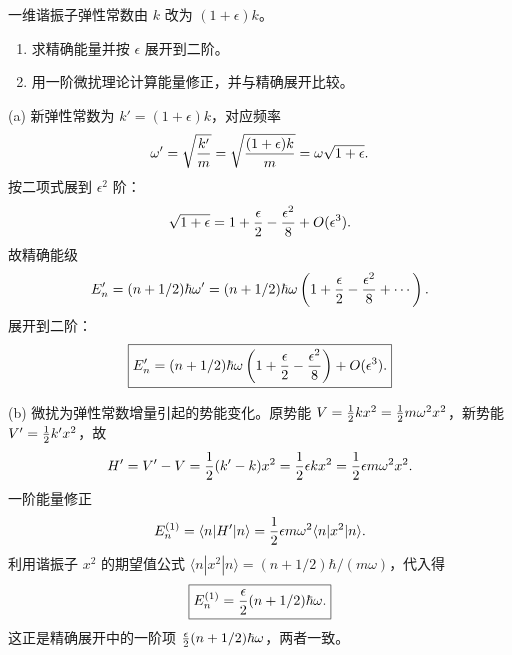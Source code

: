 \begin{question}
一维谐振子弹性常数由 $k$ 改为 $(1+\epsilon)k$。
\begin{enumerate}
\item 求精确能量并按 $\epsilon$ 展开到二阶。
\item 用一阶微扰理论计算能量修正，并与精确展开比较。
\end{enumerate}
\end{question}
\begin{solution}
(a) 新弹性常数为 $k'=(1+\epsilon)k$，对应频率
\[
\omega'=\sqrt{k'\over m}=\sqrt{(1+\epsilon)k\over m}
=\omega\sqrt{1+\epsilon}.
\]
按二项式展到 $\epsilon^2$ 阶：
\[
\sqrt{1+\epsilon}=1+{\epsilon\over2}-{\epsilon^2\over8}+O(\epsilon^3).
\]
故精确能级
\[
E_n'=(n+1/2)\hbar\omega'
=(n+1/2)\hbar\omega\left(1+{\epsilon\over2}-{\epsilon^2\over8}+\cdots\right).
\]
展开到二阶：
\[
\boxed{E_n'=(n+1/2)\hbar\omega\left(1+{\epsilon\over2}-{\epsilon^2\over8}\right)+O(\epsilon^3).}
\]

(b) 微扰为弹性常数增量引起的势能变化。原势能 $V={1\over2}kx^2={1\over2}m\omega^2x^2$，新势能 $V'={1\over2}k'x^2$，故
\[
H'=V'-V={1\over2}(k'-k)x^2={1\over2}\epsilon kx^2={1\over2}\epsilon m\omega^2x^2.
\]
一阶能量修正
\[
E_n^{(1)}=\langle n|H'|n\rangle={1\over2}\epsilon m\omega^2\langle n|x^2|n\rangle.
\]
利用谐振子 $x^2$ 的期望值公式 $\langle n|x^2|n\rangle=(n+1/2)\hbar/(m\omega)$，代入得
\[
\boxed{E_n^{(1)}={\epsilon\over2}(n+1/2)\hbar\omega.}
\]
这正是精确展开中的一阶项 ${\epsilon\over2}(n+1/2)\hbar\omega$，两者一致。
\end{solution}

